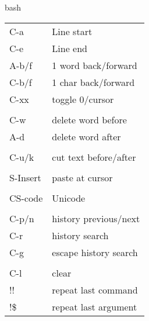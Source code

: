 \begin{conceptbox}[white]{bash}
\begin{tabular}{ll}
C-a&Line start\\
C-e&Line end\\
A-b/f&1 word back/forward\\
C-b/f&1 char back/forward\\
C-xx&toggle 0/cursor\\
\\
C-w&delete word before\\
A-d&delete word after\\
\\
C-u/k&cut text before/after\\
\\
S-Insert&paste at cursor\\
\\
CS-code&Unicode\\
\\
C-p/n&history previous/next\\
C-r&history search\\
C-g&escape history search\\
\\
C-l&clear\\

!!&repeat last command\\
!\$&repeat last argument\\

\end{tabular}

\end{conceptbox}
